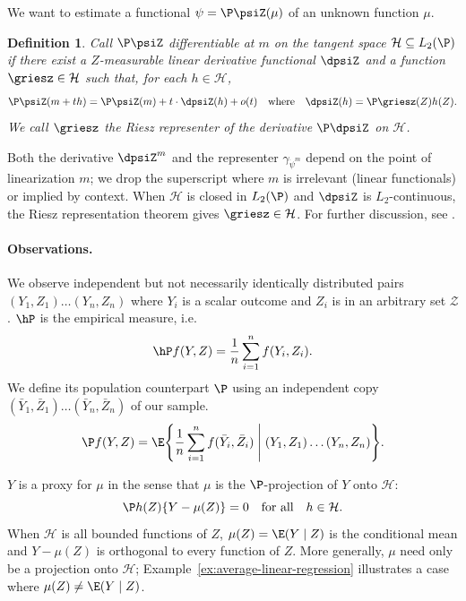 \documentclass{article}
\newtheorem{definition}{Definition}[section]
\begin{document}
We want to estimate a functional
$\psi = \P \psiZ(\mu)$
of an unknown function $\mu$.
\begin{definition}\label{def:differentiable}
Call $\P\psiZ$ \emph{differentiable} at $m$
on the tangent space $\mathcal{H} \subseteq L_2(\P)$
if there exist a $Z$-measurable linear \emph{derivative functional} $\dpsiZ$
and a function $\griesz \in \mathcal{H}$
such that, for each $h \in \mathcal{H}$,
\begin{equation}\label{eq:riesz-rep}
\P\psiZ(m + th)
  = \P\psiZ(m) + t \cdot \dpsiZ(h) + o(t) %
  \qqtext{where} \dpsiZ(h) = \P \griesz(Z) h(Z).
\end{equation}
We call $\griesz$ the \emph{Riesz representer} of the derivative $\P\dpsiZ$ on $\mathcal{H}$.
\end{definition}
Both the derivative $\dpsiZ^m$ and the
representer $\gamma_{\dot\psi^m}$ depend on the
point of linearization $m$;
we drop the superscript where $m$ is
irrelevant (linear functionals)
or implied by context.
When $\mathcal{H}$ is closed in $L_2(\P)$
and $\dpsiZ$ is $L_2$-continuous,
the Riesz representation theorem
gives $\griesz \in \mathcal{H}$.
For further discussion,
see .

\paragraph{Observations.}
We observe independent but not necessarily identically
distributed pairs $(Y_1, Z_1) \ldots (Y_n, Z_n)$
where $Y_i$ is a scalar outcome
and $Z_i$ is in an arbitrary set $\mathcal{Z}$.
$\hP$ is the empirical measure, i.e.
\begin{equation}\label{eq:empirical-product}
\hP f(Y,Z)
  = \frac{1}{n} \sum_{i=1}^n f(Y_i, Z_i).
\end{equation}
We define its population counterpart $\P$
using an independent copy $(\bar Y_1, \bar Z_1) \ldots (\bar Y_n, \bar Z_n)$ of our sample.
\begin{equation}\label{eq:P-def}
\P f(Y,Z)
  = \E\qty{\frac{1}{n} \sum_{i=1}^n
      f(\bar Y_i, \bar Z_i)
        \;\middle|\; (Y_1, Z_1) \ldots (Y_n, Z_n)}.
\end{equation}

$Y$ is a proxy for $\mu$
in the sense that $\mu$ is the $\P$-projection
of $Y$ onto $\mathcal{H}$:
\begin{equation}\label{eq:orthogonality}
\P h(Z) \{Y - \mu(Z)\} = 0
  \qqtext{for all} h \in \mathcal{H}.
\end{equation}
When $\mathcal{H}$ is all bounded functions of $Z$,
$\mu(Z) = \E(Y \mid Z)$ is the conditional mean
and $Y - \mu(Z)$ is orthogonal to every
function of $Z$.
More generally, $\mu$ need only be a projection
onto $\mathcal{H}$;
Example~\ref{ex:average-linear-regression}
illustrates a case where
$\mu(Z) \neq \E(Y \mid Z)$.
\end{document}
